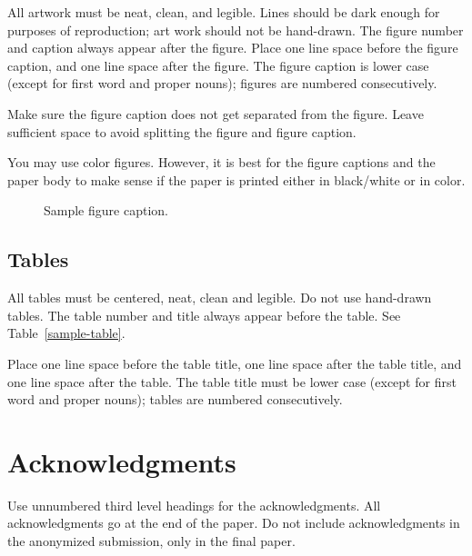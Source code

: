 \documentclass{article} %
\begin{document}
All artwork must be neat, clean, and legible. Lines should be dark
enough for purposes of reproduction; art work should not be
hand-drawn. The figure number and caption always appear after the
figure. Place one line space before the figure caption, and one line
space after the figure. The figure caption is lower case (except for
first word and proper nouns); figures are numbered consecutively.

Make sure the figure caption does not get separated from the figure.
Leave sufficient space to avoid splitting the figure and figure caption.

You may use color figures.
However, it is best for the
figure captions and the paper body to make sense if the paper is printed
either in black/white or in color.
\begin{figure}[h]
\begin{center}
\fbox{\rule[-.5cm]{0cm}{4cm} \rule[-.5cm]{4cm}{0cm}}
\end{center}
\caption{Sample figure caption.}
\end{figure}

\subsection{Tables}

All tables must be centered, neat, clean and legible. Do not use hand-drawn
tables. The table number and title always appear before the table. See
Table~\ref{sample-table}.

Place one line space before the table title, one line space after the table
title, and one line space after the table. The table title must be lower case
(except for first word and proper nouns); tables are numbered consecutively.


\section{Acknowledgments}

Use unnumbered third level headings for the acknowledgments. All
acknowledgments go at the end of the paper. Do not include
acknowledgments in the anonymized submission, only in the
final paper.
\end{document}
